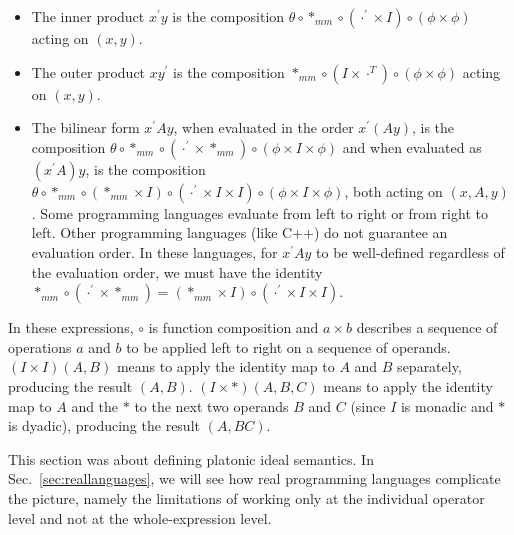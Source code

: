 \begin{itemize}
\item
The inner product $x^\prime y$ is the composition
$\theta\circ*_{mm}\circ\left(\cdot^\prime\times I\right)\circ\left(\phi\times\phi\right)$
acting on $(x,y)$.

\item
The outer product $xy^\prime$ is the composition
$*_{mm}\circ\left(I\times\cdot^{T}\right)\circ\left(\phi\times\phi\right)$
acting on $(x,y)$.

\item
The bilinear form $x^\prime Ay$, when evaluated in the order $x^\prime(Ay)$, is the composition
$\theta\circ*_{mm}\circ\left(\cdot^\prime\times*_{mm}\right)\circ\left(\phi\times I\times\phi\right)$ %
%
and when evaluated as $(x^\prime A)y$,
is the composition $\theta\circ*_{mm}\circ\left(*_{mm}\times I\right)\circ\left(\cdot^\prime\times I\times I\right)\circ\left(\phi\times I\times\phi\right)$,
%
both acting on $(x,A,y)$.
%
Some programming languages evaluate from left to right or from right to left.
Other programming languages (like C++) do not guarantee an evaluation order.
In these languages, for $x^\prime Ay$ to be well-defined regardless of the evaluation order, we must have the identity $*_{mm}\circ\left(\cdot^\prime\times*_{mm}\right)=\left(*_{mm}\times I\right)\circ\left(\cdot^\prime\times I\times I\right)$.
\end{itemize}

In these expressions, $\circ$ is function composition and $a\times b$
describes a sequence of operations $a$ and $b$ to be applied left
to right on a sequence of operands. $(I\times I)(A,B)$ means to apply
the identity map to $A$ and $B$ separately, producing the result
$(A,B)$. $(I\times*)(A,B,C)$ means to apply the identity map to
$A$ and the $*$ to the next two operands $B$ and $C$ (since $I$
is monadic and $*$ is dyadic), producing the result $(A,BC)$.

This section was about defining platonic ideal semantics. In Sec.~\ref{sec:reallanguages}, we will see how real programming languages complicate the picture, namely the limitations of working only at the individual operator level and not at the whole-expression level.
